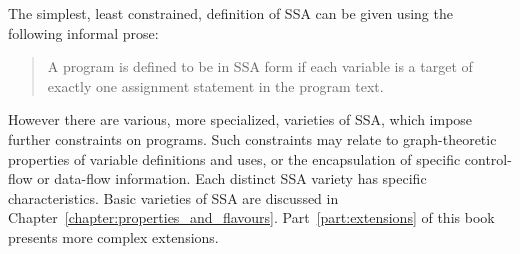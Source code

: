 The simplest,  least constrained, definition of SSA can be given using the following informal prose: %

\begin{quote}
A program is defined to be in SSA form if each variable is a target of exactly one assignment statement in the program text.
\end{quote}

However there are various, more specialized, varieties of SSA, which impose further constraints on programs. 
Such constraints may relate to graph-theoretic properties of variable definitions and uses, or the encapsulation of specific control-flow or data-flow information. 
Each distinct SSA variety has specific characteristics. 
Basic varieties of SSA are discussed in Chapter~\ref{chapter:properties_and_flavours}. 
Part~\ref{part:extensions} of this book presents more complex extensions.

